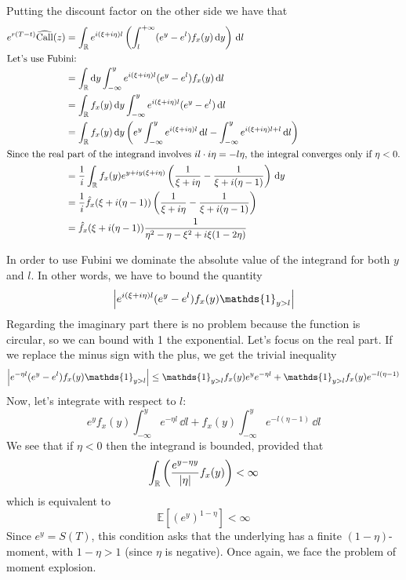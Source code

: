 Putting the discount factor on the other side we have that
\begin{align*}
    e^{r(T-t)}\widehat{\operatorname{Call}}(z) &= \int_{\mathbb{R}} e^{i(\xi+i\eta)l} \left( \int_{l}^{+\infty} (e^y - e^l)f_x(y)\,\dd y \right)\,\dd l \\
    \intertext{Let's use Fubini:}
    &=
    \int_{\mathbb{R}}\dd y \int_{-\infty}^y e^{i(\xi+i\eta)l} (e^y - e^l)f_x(y)\,\dd l \\
    &=
    \int_{\mathbb{R}}f_x(y)\,\dd y \int_{-\infty}^y e^{i(\xi+i\eta)l} (e^y - e^l)\,\dd l \\
    &=
    \int_{\mathbb{R}}f_x(y)\,\dd y \left(e^y \int_{-\infty}^y e^{i(\xi+i\eta)l}\,\dd l - \int_{-\infty}^y e^{i(\xi+i\eta)l + l}\,\dd l \right)\\
    \intertext{Since the real part of the integrand involves $il\cdot i\eta = -l\eta$, the integral converges only if $\eta<0$.}
    &=
    \frac{1}{i} \int_{\mathbb{R}}f_x(y) e^{y + iy(\xi+i\eta)}\left(\frac{1}{\xi+i\eta} - \frac{1}{\xi+i(\eta-1)}\right)\,\dd y \\
    &=
    \frac{1}{i} \hat{f}_x(\xi+i(\eta-1))\left(\frac{1}{\xi+i\eta} - \frac{1}{\xi+i(\eta-1)}\right) \\
    &=
    \hat{f}_x(\xi+i(\eta-1))\frac{1}{\eta^2-\eta-\xi^2+i\xi(1-2\eta)}
\end{align*}
\begin{remark}
    In order to use Fubini we dominate the absolute value of the integrand for both $y$ and $l$. In other words, we have to bound the quantity
    \begin{equation*}
        \abs{e^{i(\xi+i\eta)l} (e^y - e^l)f_x(y)\mathds{1}_{y>l}}
    \end{equation*}
    Regarding the imaginary part there is no problem because the function is circular, so we can bound with 1 the exponential. Let's focus on the real part. If we replace the minus sign with the plus, we get the trivial inequality
    \begin{equation*}
        \abs{e^{-\eta l} (e^y - e^l)f_x(y)\mathds{1}_{y>l}} \le \mathds{1}_{y>l}f_x(y)e^ye^{-\eta l} + \mathds{1}_{y>l}f_x(y)e^{-l(\eta-1)}
    \end{equation*}
    Now, let's integrate with respect to $l$:
    \begin{equation*}
        e^y f_x(y) \int_{-\infty}^y e^{-\eta l}\,\dd l + f_x(y) \int_{-\infty}^y e^{-l(\eta-1)}\,\dd l
    \end{equation*}
    We see that if $\eta<0$ then the integrand is bounded, provided that
    \begin{equation*}
        \int_{\mathbb{R}}\left(\frac{e^{y-\eta y}}{\abs{\eta}}f_x(y)\right) < \infty
    \end{equation*}
    which is equivalent to
    \begin{equation*}
        \mathbb{E}\left[(e^y)^{1-\eta}\right] < \infty
    \end{equation*}
    Since $e^y = S(T)$, this condition asks that the underlying has a finite $(1-\eta)$-moment, with $1-\eta>1$ (since $\eta$ is negative). Once again, we face the problem of moment explosion.
\end{remark}
